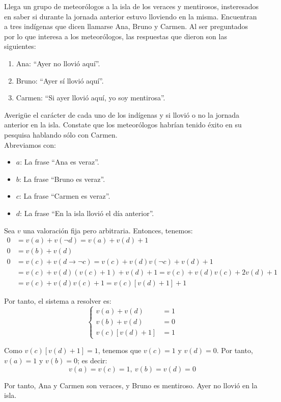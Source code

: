 \begin{ejercicio}
    Llega un grupo de meteorólogos a la isla de los veraces y mentirosos, insteresados en saber si durante
    la jornada anterior estuvo lloviendo en la misma. Encuentran a tres indígenas que dicen llamarse
    Ana, Bruno y Carmen. Al ser preguntados por lo que interesa a los meteorólogos, las respuestas
    que dieron son las siguientes:
    \begin{enumerate}
        \item Ana: ``Ayer no llovió aquí''.
        \item Bruno: ``Ayer sí llovió aquí''.
        \item Carmen: ``Si ayer llovió aquí, yo soy mentirosa''.
    \end{enumerate}
    Averigüe el carácter de cada uno de los indígenas y si llovió o no la jornada anterior en la isla.
    Constate que los meteorólogos habrían tenido éxito en su pesquisa hablando sólo con Carmen.\\

    Abreviamos con:
    \begin{itemize}
        \item $a$: La frase ``Ana es veraz''.
        \item $b$: La frase ``Bruno es veraz''.
        \item $c$: La frase ``Carmen es veraz''.
        \item $d$: La frase ``En la isla llovió el día anterior''.
    \end{itemize}

    Sea $v$ una valoración fija pero arbitraria. Entonces, tenemos:
    \begin{align*}
        0 &= v(a) + v(\lnot d) = v(a) + v(d)+1\\
        0 &= v(b) + v(d)\\
        0 &= v(c) + v(d\rightarrow\lnot c) = v(c) +v(d)v(\lnot c) + v(d) + 1\\
        &= v(c) +v(d)(v(c)+1) + v(d) + 1 = v(c) +v(d)v(c) + 2v(d) + 1\\
        &= v(c) +v(d)v(c) + 1 = v(c)[v(d)+1] + 1
    \end{align*}

    Por tanto, el sistema a resolver es:
    \begin{equation*}
        \left\{
            \begin{aligned}
                v(a) + v(d) &= 1\\
                v(b) + v(d) &= 0\\
                v(c)[v(d)+1] &= 1
            \end{aligned}
        \right.
    \end{equation*}

    Como $v(c)[v(d)+1]=1$, tenemos que $v(c)=1$ y $v(d)=0$.
    Por tanto, $v(a)=1$ y $v(b)=0$; es decir:
    \begin{equation*}
        v(a)=v(c)=1,~v(b)=v(d)=0
    \end{equation*}

    Por tanto, Ana y Carmen son veraces, y Bruno es mentiroso. Ayer no llovió en la isla.
\end{ejercicio}


